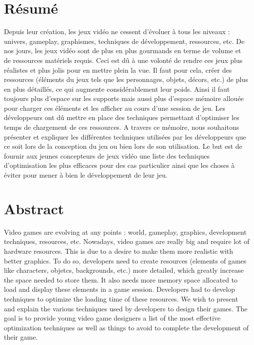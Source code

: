 \documentclass[a4paper, 12pt]{article} %
\begin{document}
\section{Résumé}
Depuis leur création, les jeux vidéo ne cessent d'évoluer à tous les niveaux : univers, gameplay, graphismes, techniques de développement, ressources, etc. De nos jours, les jeux vidéo sont de plus en plus gourmands en terme de volume et de ressources matériels requis. Ceci est dû à une volonté de rendre ces jeux plus réalistes et plus jolis pour en mettre plein la vue. Il faut pour cela, créer des ressources (éléments du jeux tels que les personnages, objets, décors, etc.) de plus en plus détaillés, ce qui augmente considérablement leur poids. Ainsi il faut toujours plus d'espace sur les supports mais aussi plus d'espace mémoire allouée pour charger ces éléments et les afficher au cours d'une session de jeu. Les développeurs ont dû mettre en place des techniques permettant d'optimiser les temps de chargement de ces ressources. A travers ce mémoire, nous souhaitons présenter et expliquer les différentes techniques utilisées par les développeurs que ce soit lors de la conception du jeu ou bien lors de son utilisation. Le but est de fournir aux jeunes concepteurs de jeux vidéo une liste des techniques d'optimisation les plus efficaces pour des cas particulier ainsi que les choses à éviter pour mener à bien le développement de leur jeu.

\section{Abstract}
Video games are evolving at any points : world, gameplay, graphics, development techniques, resources, etc. Nowadays, video games are really big and require lot of hardware resources. This is due to a desire to make them more realistic with better graphics. To do so, developers need to create resources (elements of games like characters, objetcs, backgrounds, etc.) more detailed, which greatly increase the space needed to store them. It also needs more memory space allocated to load and display these elements in a game session. Developers had to develop techniques to optimize the loading time of these resources. We wish to present and explain the various techniques used by developers to design their games. The goal is to provide young video game designers a list of the most effective optimization techniques as well as things to avoid to complete the development of their game.
\end{document}
